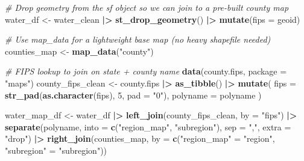 \documentclass[
]{article}
\newenvironment{Shaded}{\begin{snugshade}}{\end{snugshade}}
\newcommand{\AttributeTok}[1]{\textcolor[rgb]{0.13,0.29,0.53}{#1}}
\newcommand{\CommentTok}[1]{\textcolor[rgb]{0.56,0.35,0.01}{\textit{#1}}}
\newcommand{\DecValTok}[1]{\textcolor[rgb]{0.00,0.00,0.81}{#1}}
\newcommand{\FunctionTok}[1]{\textcolor[rgb]{0.13,0.29,0.53}{\textbf{#1}}}
\newcommand{\NormalTok}[1]{#1}
\newcommand{\OtherTok}[1]{\textcolor[rgb]{0.56,0.35,0.01}{#1}}
\newcommand{\SpecialCharTok}[1]{\textcolor[rgb]{0.81,0.36,0.00}{\textbf{#1}}}
\newcommand{\StringTok}[1]{\textcolor[rgb]{0.31,0.60,0.02}{#1}}
\begin{document}
\begin{Shaded}
\begin{Highlighting}[]
\CommentTok{\# Drop geometry from the sf object so we can join to a pre{-}built county map}
\NormalTok{water\_df }\OtherTok{\textless{}{-}}\NormalTok{ water\_clean }\SpecialCharTok{|\textgreater{}}
  \FunctionTok{st\_drop\_geometry}\NormalTok{() }\SpecialCharTok{|\textgreater{}}
  \FunctionTok{mutate}\NormalTok{(}\AttributeTok{fips =}\NormalTok{ geoid)}

\CommentTok{\# Use map\_data for a lightweight base map (no heavy shapefile needed)}
\NormalTok{counties\_map }\OtherTok{\textless{}{-}} \FunctionTok{map\_data}\NormalTok{(}\StringTok{"county"}\NormalTok{)}

\CommentTok{\# FIPS lookup to join on state + county name}
\FunctionTok{data}\NormalTok{(county.fips, }\AttributeTok{package =} \StringTok{"maps"}\NormalTok{)}
\NormalTok{county\_fips\_clean }\OtherTok{\textless{}{-}}\NormalTok{ county.fips }\SpecialCharTok{|\textgreater{}}
  \FunctionTok{as\_tibble}\NormalTok{() }\SpecialCharTok{|\textgreater{}}
  \FunctionTok{mutate}\NormalTok{(}
    \AttributeTok{fips      =} \FunctionTok{str\_pad}\NormalTok{(}\FunctionTok{as.character}\NormalTok{(fips), }\DecValTok{5}\NormalTok{, }\AttributeTok{pad =} \StringTok{"0"}\NormalTok{),}
    \AttributeTok{polyname  =}\NormalTok{ polyname}
\NormalTok{  )}

\NormalTok{water\_map\_df }\OtherTok{\textless{}{-}}\NormalTok{ water\_df }\SpecialCharTok{|\textgreater{}}
  \FunctionTok{left\_join}\NormalTok{(county\_fips\_clean, }\AttributeTok{by =} \StringTok{"fips"}\NormalTok{) }\SpecialCharTok{|\textgreater{}}
  \FunctionTok{separate}\NormalTok{(polyname, }\AttributeTok{into =} \FunctionTok{c}\NormalTok{(}\StringTok{"region\_map"}\NormalTok{, }\StringTok{"subregion"}\NormalTok{), }\AttributeTok{sep =} \StringTok{","}\NormalTok{, }\AttributeTok{extra =} \StringTok{"drop"}\NormalTok{) }\SpecialCharTok{|\textgreater{}}
  \FunctionTok{right\_join}\NormalTok{(counties\_map, }\AttributeTok{by =} \FunctionTok{c}\NormalTok{(}\StringTok{"region\_map"} \OtherTok{=} \StringTok{"region"}\NormalTok{, }\StringTok{"subregion"} \OtherTok{=} \StringTok{"subregion"}\NormalTok{))}


\end{Highlighting}
\end{Shaded}
\end{document}
